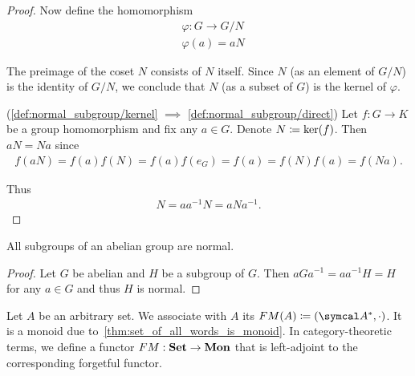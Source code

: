 \begin{proof}
  Now define the homomorphism
  \begin{align*}
    &\varphi: G \to G / N \\
    &\varphi(a) = aN
  \end{align*}

  The preimage of the coset \( N \) consists of \( N \) itself. Since \( N \) (as an element of \( G / N \)) is the identity of \( G / N \), we conclude that \( N \) (as a subset of \( G \)) is the kernel of \( \varphi \).

  (\ref{def:normal_subgroup/kernel} \( \implies \) \ref{def:normal_subgroup/direct}) Let \( f: G \to K \) be a group homomorphism and fix any \( a \in G \). Denote \( N \coloneqq \operatorname{ker}(f) \). Then \( aN = Na \) since
  \begin{align*}
    f(aN)
    =
    f(a) f(N)
    =
    f(a) f(e_G)
    =
    f(a)
    =
    f(N) f(a)
    =
    f(Na).
  \end{align*}

  Thus
  \begin{align*}
    N = aa^{-1}N = aNa^{-1}.
  \end{align*}
\end{proof}

\begin{proposition}\label{thm:abelian_normal_subgroups}
  All subgroups of an abelian group are normal.
\end{proposition}
\begin{proof}
  Let \( G \) be abelian and \( H \) be a subgroup of \( G \). Then \( aGa^{-1} = aa^{-1}H = H \) for any \( a \in G \) and thus \( H \) is normal.
\end{proof}

\begin{definition}\label{def:free_monoid}\cite[306]{Knapp2016BAlg}
  Let \( A \) be an arbitrary set. We associate with \( A \) its  \( FM(A) \coloneqq (\Cal{A}^{*}, \cdot) \). It is a monoid due to~\cref{thm:set_of_all_words_is_monoid}. In category-theoretic terms, we define a functor \( FM: \operatorname{\mathbf{Set}} \to \operatorname{\mathbf{Mon}} \) that is left-adjoint to the corresponding forgetful functor.
\end{definition}

